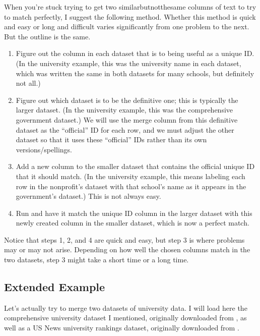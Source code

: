 \documentclass[letterpaper,10pt,english]{jupyterBook}
\begin{document}
\sphinxAtStartPar
When you’re stuck trying to get two similar\sphinxhyphen{}but\sphinxhyphen{}not\sphinxhyphen{}the\sphinxhyphen{}same columns of text to try to match perfectly, I suggest the following method.  Whether this method is quick and easy or long and difficult varies significantly from one problem to the next.  But the outline is the same.
\begin{enumerate}
%
\item {} 
\sphinxAtStartPar
Figure out the column in each dataset that is  to being useful as a unique ID.  (In the university example, this was the university name in each dataset, which was written the same in both datasets for many schools, but definitely not all.)

\item {} 
\sphinxAtStartPar
Figure out which dataset is to be the definitive one; this is typically the larger dataset.  (In the university example, this was the comprehensive government dataset.)  We will use the merge column from this definitive dataset as the “official” ID for each row, and we must adjust the other dataset so that it uses these “official” IDs rather than its own versions/spellings.

\item {} 
\sphinxAtStartPar
Add a new column to the smaller dataset that contains the official unique ID  that it should match.  (In the university example, this means labeling each row in the nonprofit’s dataset with that school’s name as it appears in the government’s dataset.)  This is not always easy.

\item {} 
\sphinxAtStartPar
Run  and have it match the unique ID column in the larger dataset with this newly created column in the smaller dataset, which is now a perfect match.

\end{enumerate}

\sphinxAtStartPar
Notice that steps 1, 2, and 4 are quick and easy, but step 3 is where problems may or may not arise.  Depending on how well the chosen columns match in the two datasets, step 3 might take a short time or a long time.


\subsection{Extended Example}
\label{\detokenize{chapter-12-concat-and-merge:extended-example}}
\sphinxAtStartPar
Let’s actually try to merge two datasets of university data.  I will load here the comprehensive university dataset I mentioned, originally downloaded from , as well as a US News university rankings dataset, originally downloaded from .
\end{document}
